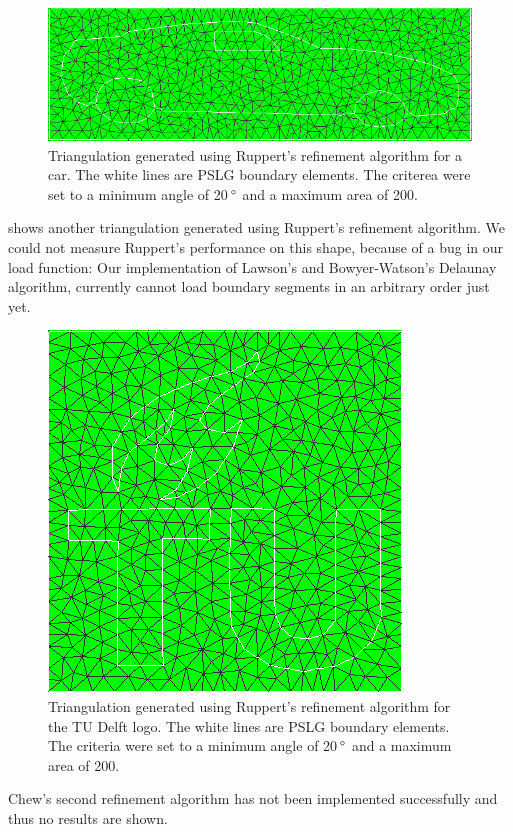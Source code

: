 \begin{figure}
    \centering
    \includegraphics[width=\columnwidth]{../images/Car_Ruppert20.png}
    \caption{Triangulation generated using Ruppert's refinement algorithm for a car. The white lines are PSLG boundary elements.
    The criterea were set to a minimum angle of 20$\,^{\circ}$ and a maximum area of 200.}
    \label{fig:result_Car20}
\end{figure}

 shows another triangulation generated using Ruppert's refinement algorithm.
We could not measure Ruppert's performance on this shape, because of a bug in our load function:
Our implementation of Lawson's and Bowyer-Watson's Delaunay algorithm, currently cannot load
boundary segments in an arbitrary order just yet.

\begin{figure}
    \centering
    \includegraphics[width=\columnwidth]{../images/TU_Ruppert20.png}
    \caption{Triangulation generated using Ruppert's refinement algorithm for the TU Delft logo. The white lines are PSLG boundary elements.
    The criteria were set to a minimum angle of 20$\,^{\circ}$ and a maximum area of 200.}
    \label{fig:result_TU20}
\end{figure}

Chew's second refinement algorithm has not been implemented successfully and thus no results are shown.


